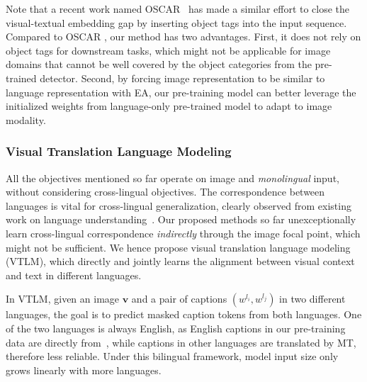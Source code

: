 \documentclass[final]{cvpr}
\newcommand{\luowei}[1]{\textcolor{cyan}{\small{\bf [Luowei: #1 ]}}}
\newcommand{\jj}[1]{\textcolor{red}{\small{\bf [JJ: #1 ]}}}
\begin{document}
Note that a recent work named OSCAR~\cite{OSCAR} has made a similar effort to close the visual-textual embedding gap by inserting object tags into the input sequence. Compared to OSCAR \cite{OSCAR}, our method has two advantages. First, it does not rely on object tags for downstream tasks, which might not be applicable for image domains that cannot be well covered by the object categories from the pre-trained detector. Second, by forcing image representation to be similar to language representation with EA, our pre-training model can better leverage the initialized weights from language-only pre-trained model to adapt to image modality.


\subsubsection{Visual Translation Language Modeling}
All the objectives mentioned so far operate on image and \emph{monolingual} input, without considering cross-lingual objectives. The correspondence between languages is vital for cross-lingual generalization, clearly observed from existing work on language understanding~\cite{XLMR}. Our proposed methods so far unexceptionally learn cross-lingual correspondence \emph{indirectly} through the image focal point, which might not be sufficient.  We hence propose visual translation language modeling (VTLM), which directly and jointly learns the alignment between visual context and text in different languages.

In VTLM, given an image $\boldsymbol{v}$ and a pair of captions $(w^{l_i}, w^{l_j})$ in two different languages, the goal is to predict masked caption tokens from both languages. One of the two languages is always English, as English captions in our pre-training data are directly from~\cite{conceptual-caption}, while captions in other languages are translated by MT, therefore less reliable. Under this bilingual framework, model input size only grows linearly with more languages.
\end{document}
